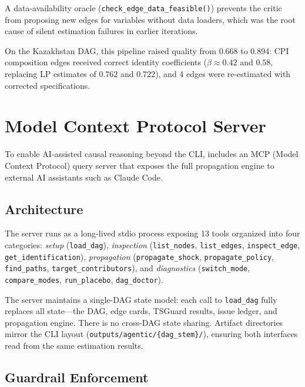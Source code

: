 \documentclass{article}
\begin{document}
A data-availability oracle (\texttt{check\_edge\_data\_feasible()}) prevents the critic from proposing new edges for variables without data loaders, which was the root cause of silent estimation failures in earlier iterations.

On the Kazakhstan DAG, this pipeline raised quality from 0.668 to 0.894: CPI composition edges received correct identity coefficients ($\beta \approx 0.42$ and $0.58$, replacing LP estimates of $0.762$ and $0.722$), and 4 edges were re-estimated with corrected specifications.

\section{Model Context Protocol Server}
\label{sec:mcp}

To enable AI-assisted causal reasoning beyond the CLI, \oc{} includes an MCP (Model Context Protocol) query server that exposes the full propagation engine to external AI assistants such as Claude Code.

\subsection{Architecture}

The server runs as a long-lived stdio process exposing 13 tools organized into four categories: \emph{setup} (\texttt{load\_dag}), \emph{inspection} (\texttt{list\_nodes}, \texttt{list\_edges}, \texttt{inspect\_edge}, \texttt{get\_identification}), \emph{propagation} (\texttt{propagate\_shock}, \texttt{propagate\_policy}, \texttt{find\_paths}, \texttt{target\_contributors}), and \emph{diagnostics} (\texttt{switch\_mode}, \texttt{compare\_modes}, \texttt{run\_placebo}, \texttt{dag\_doctor}).

The server maintains a single-DAG state model: each call to \texttt{load\_dag} fully replaces all state---the DAG, edge cards, TSGuard results, issue ledger, and propagation engine. There is no cross-DAG state sharing. Artifact directories mirror the CLI layout (\texttt{outputs/agentic/\{dag\_stem\}/}), ensuring both interfaces read from the same estimation results.

\subsection{Guardrail Enforcement}
\end{document}
